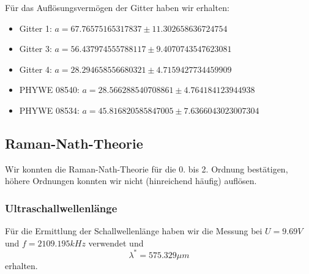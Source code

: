 Für das Auflösungsvermögen der Gitter haben wir erhalten:

\begin{itemize}
\item Gitter 1: $ a = 67.76575165317837 \pm 11.302658636724754 $
\item Gitter 3: $ a = 56.437974555788117 \pm 9.4070743547623081 $
\item Gitter 4: $ a = 28.294658556680321 \pm 4.7159427734459909 $
\item PHYWE 08540: $ a = 28.566288540708861 \pm 4.764184123944938 $
\item PHYWE 08534: $ a = 45.816820585847005 \pm 7.6366043023007304 $
\end{itemize}


\subsection{Raman-Nath-Theorie}

Wir konnten die Raman-Nath-Theorie für die 0. bis 2. Ordnung bestätigen, höhere Ordnungen konnten wir nicht (hinreichend häufig) auflösen.

\subsubsection{Ultraschallwellenlänge}

Für die Ermittlung der Schallwellenlänge haben wir die Messung bei $ U = 9.69 V$ und $f = 2109.195 kHz $ verwendet und  
$$\boxed{ \lambda^* = 575.329 \mu m}$$
erhalten.
